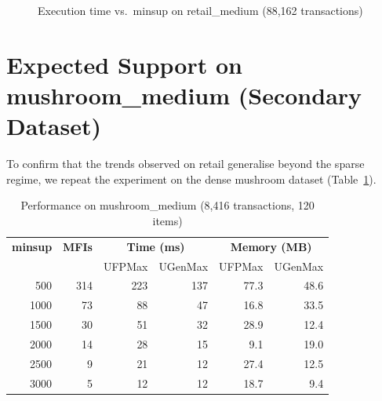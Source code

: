 \documentclass[12pt,a4paper]{report}
\begin{document}
  \begin{figure}[h]
    \centering
    \caption{Execution time vs.\ minsup on retail\_medium (88,162 transactions)}
    \label{fig:retail_time}
  \end{figure}

  \section{Expected Support on mushroom\_medium (Secondary Dataset)}

  To confirm that the trends observed on retail generalise beyond the sparse regime, we repeat the experiment on the dense mushroom dataset (Table~\ref{tab:mushroom_minsup}).

  \begin{table}[h]
    \centering
    \caption{Performance on mushroom\_medium (8,416 transactions, 120 items)}
    \label{tab:mushroom_minsup}
    \begin{tabular}{rrrrrr}
      \toprule
      \textbf{minsup} & \textbf{MFIs} & \multicolumn{2}{c}{\textbf{Time (ms)}} & \multicolumn{2}{c}{\textbf{Memory (MB)}} \\
      & & UFPMax & UGenMax & UFPMax & UGenMax \\
      \midrule
      500 & 314 & 223 & 137 & 77.3 & 48.6 \\
      1000 & 73 & 88 & 47 & 16.8 & 33.5 \\
      1500 & 30 & 51 & 32 & 28.9 & 12.4 \\
      2000 & 14 & 28 & 15 & 9.1 & 19.0 \\
      2500 & 9 & 21 & 12 & 27.4 & 12.5 \\
      3000 & 5 & 12 & 12 & 18.7 & 9.4 \\
      \bottomrule
    \end{tabular}
  \end{table}
\end{document}
